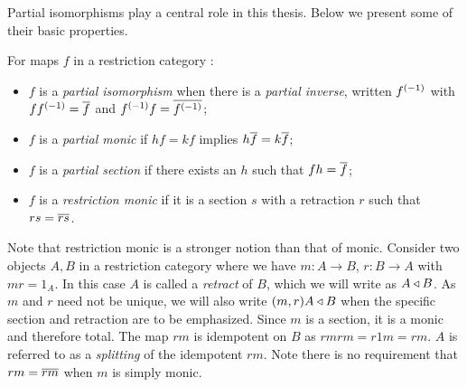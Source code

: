 Partial isomorphisms play a central role in this thesis. Below we present
some of their basic properties.

\begin{definition}\label{def:partial_inverse_etc}
  For maps $f$ in a restriction category \X:
  \begin{itemize}
    \item $f$ is a \emph{partial isomorphism} when there is a \emph{partial inverse}, written
      ${f}^{(-1)}$ with $f{f}^{(-1)} =\overline{f}$ and ${f}^{(-1)}f = \overline{{f}^{(-1)}}$;
    \item $f$ is a \emph{partial monic} if $h f = k f$ implies $h \overline{f} = k \overline{f}$;
    \item $f$ is a \emph{partial section} if there exists an  $h$ such that $f h = \overline{f}$;
    \item $f$ is a \emph{restriction monic} if it is a section $s$ with a retraction
      $r$ such that $r s = \overline{r s}$.
  \end{itemize}
\end{definition}

Note that restriction monic is a stronger notion than that of monic. Consider two objects $A, B$
in a restriction category where we have $m: A\to B$, $r:B \to A$ with $m r = 1_A$. In this case
$A$ is called a \emph{retract} of $B$, which we will write as $A\triangleleft B$. As $m$ and $r$ need
not be unique, we will also write $(m,r) A \triangleleft B$ when the specific section and retraction
are to be emphasized. Since $m$ is a section,
it is a monic and therefore total. The map $r m$ is idempotent on $B$ as $r m r m = r 1 m = r m$.
$A$ is referred to as a \emph{splitting} of the idempotent $r m$. Note there is no requirement that
$r m = \overline{r m}$ when $m$ is simply monic.

